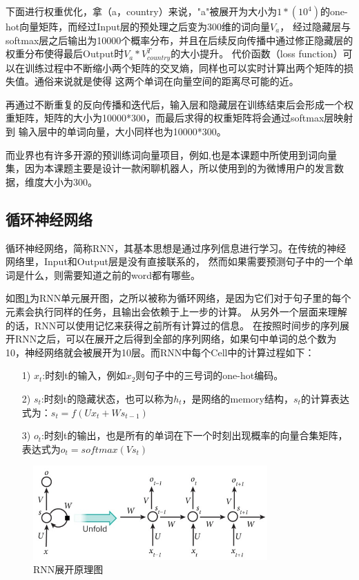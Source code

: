 \documentclass[supercite]{HustGraduPaper}
\theoremstyle{definition}
\begin{document}
下面进行权重优化，拿（a，country）来说，"a"被展开为大小为$1*(10^4)$的one-hot向量矩阵，而经过Input层的预处理之后变为300维的词向量$V_{a}$，
经过隐藏层与softmax层之后输出为10000个概率分布，并且在后续反向传播中通过修正隐藏层的权重分布使得最后Output时$V_{a} * V_{country}^T$的大小提升。
代价函数（loss function）可以在训练过程中不断缩小两个矩阵的交叉熵，同样也可以实时计算出两个矩阵的损失值。通俗来说就是使得
这两个单词在向量空间的距离尽可能的近。

再通过不断重复的反向传播和迭代后，输入层和隐藏层在训练结束后会形成一个权重矩阵，矩阵的大小为10000*300，而最后求得的权重矩阵将会通过softmax层映射到
输入层中的单词向量，大小同样也为10000*300。

而业界也有许多开源的预训练词向量项目，例如\cite{wordvector},也是本课题中所使用到词向量集，因为本课题主要是设计一款闲聊机器人，所以使用到的为微博用户的发言数据，维度大小为300。


\subsection{循环神经网络}
循环神经网络，简称RNN\cite{mikolov2010recurrent}，其基本思想是通过序列信息进行学习。在传统的神经网络里，Input和Output层是没有直接联系的，
然而如果需要预测句子中的一个单词是什么，则需要知道之前的word都有哪些。

如图\ref{Fig.rnn}为RNN单元展开图，之所以被称为循环网络，是因为它们对于句子里的每个元素会执行同样的任务，且输出会依赖于上一步的计算。
从另外一个层面来理解的话，RNN可以使用记忆来获得之前所有计算过的信息。
在按照时间步的序列展开RNN之后，可以在展开之后得到全部的序列网络，如果句中单词的总个数为10，神经网络就会被展开为10层。而RNN中每个Cell中的计算过程如下：

\begin{itemize}
  \item [1)] $x_t$:时刻t的输入，例如$x_2$则句子中的三号词的one-hot编码。
  \item [2)] $s_t$:时刻t的隐藏状态，也可以称为$h_t$，是网络的memory结构，$s_t$的计算表达式为：$s_t=f(Ux_t + Ws_{t-1})$
  \item [3)] $o_t$:时刻t的输出，也是所有的单词在下一个时刻出现概率的向量合集矩阵，表达式为$o_t = softmax(Vs_t)$
\end{itemize}

\begin{figure}[htbp] %
  \centering %
  \includegraphics[width=0.8\textwidth]{images/rnn.png} %
  \caption{RNN展开原理图} %
  \label{Fig.rnn} %
\end{figure}
\end{document}
